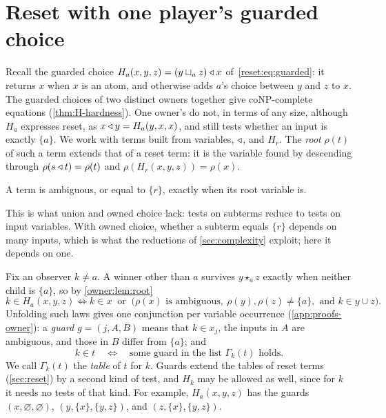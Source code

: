 \section{Reset with one player's guarded choice}\label{sec:one-owner}

Recall the guarded choice $H_a(x,y,z)=(y\sqcup_a z)\mathbin{\triangleleft} x$ of~\eqref{reset:eq:guarded}: it returns $x$ when $x$ is an atom, and otherwise adds $a$'s choice between $y$ and $z$ to $x$. The guarded choices of two distinct owners together give coNP-complete equations (\cref{thm:H-hardness}). One owner's do not, in terms of any size, although $H_a$ expresses reset, as $x\mathbin{\triangleleft} y=H_a(y,x,x)$, and still tests whether an input is exactly $\{a\}$. We work with terms built from variables, $\mathbin{\triangleleft}$, and $H_r$. The \emph{root} $\rho(t)$ of such a term extends that of a reset term: it is the variable found by descending through $\rho(s\mathbin{\triangleleft} t)=\rho(t)$ and $\rho(H_r(x,y,z))=\rho(x)$.

\begin{lemma}\label{owner:lem:root}
A term is ambiguous, or equal to $\{r\}$, exactly when its root variable is.
\end{lemma}

This is what union and owned choice lack: tests on subterms reduce to tests on input variables. With owned choice, whether a subterm equals $\{r\}$ depends on many inputs, which is what the reductions of \cref{sec:complexity} exploit; here it depends on one.

Fix an observer $k\ne a$. A winner other than $a$ survives $y\star_a z$ exactly when neither child is $\{a\}$, so by \cref{owner:lem:root}
\[
 k\in H_a(x,y,z)\iff k\in x\ \text{ or }\ \bigl(\rho(x)\text{ is ambiguous},\ \rho(y),\rho(z)\ne\{a\},\text{ and }k\in y\cup z\bigr).
\]
Unfolding such laws gives one conjunction per variable occurrence (\cref{app:proofs-owner}): a \emph{guard} $g=(j,A,B)$ means that $k\in x_j$, the inputs in $A$ are ambiguous, and those in $B$ differ from $\{a\}$; and
\begin{equation}\label{owner:eq:guards}
 k\in t\quad\Longleftrightarrow\quad\text{some guard in the list }\Gamma_k(t)\text{ holds}.
\end{equation}
We call $\Gamma_k(t)$ the \emph{table} of $t$ for $k$. Guards extend the tables of reset terms (\cref{sec:reset}) by a second kind of test, and $H_k$ may be allowed as well, since for $k$ it needs no tests of that kind. For example, $H_a(x,y,z)$ has the guards $(x,\varnothing,\varnothing)$, $(y,\{x\},\{y,z\})$, and $(z,\{x\},\{y,z\})$.

